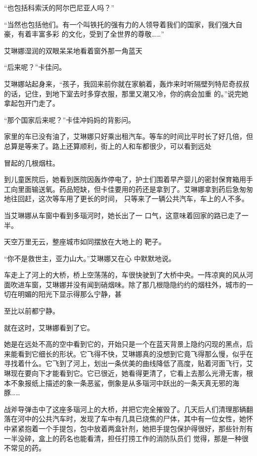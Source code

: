 \documentclass{article}
\begin{document}
“也包括科索沃的阿尔巴尼亚人吗？” 

“当然也包括他们。有一个叫铁托的强有力的人领导着我们的国家，我们强大自豪，有着丰富多彩
的文化，受到了全世界的尊敬……” 

艾琳娜湿润的双眼呆呆地看着窗外那一角蓝天


“后来呢？”卡佳问。 

艾琳娜站起身来，“孩子，我回来前你就在家躺着，轰炸来时听隔壁列特尼奇叔叔的话，记住，到地下室去时多穿衣服，那里又潮又冷，你的病会加重
的。”说完她拿起包开门走了。 

“那个国家后来呢？”卡佳冲妈妈的背影问。

家里的车已没有油了，艾琳娜只好乘出租汽车。等车的时间比平时长了好几倍，但总算是等来了。路上还算顺利，街上的人和车都很少，可以看到远处

\newpage
冒起的几根烟柱。 

到儿童医院后，她看到医院因轰炸停电了，护士们围着早产婴儿的密封保育箱用手工向里面输送氧。药品短缺，但卡佳要用的药还是拿到了。艾琳娜拿到药后急匆匆地往回赶，这次等车用了更长的时间，
只等来了一辆公共汽车，车上的人不多。 

当艾琳娜从车窗中看到多瑙河时，她长出了一
口气，这意味着回家的路已走了一半。 

天空万里无云，整座城市如同摆放在大地上的
靶子。 

“你不是救世主，亚力山大。”艾琳娜又在心
中默默地说。 

车走上了河上的大桥，桥上空荡荡的，车很快驶到了大桥中央。一阵凉爽的风从河面吹进车窗，艾琳娜并没有闻到硝烟味。除了那几根隐隐约约的烟柱外，城市的一切在明媚的阳光下显示得那么宁静，甚

\newpage
至比以前都宁静。 


就在这时，艾琳娜看到了它。 

她是在远处不高的空中看到它的，开始只是一个在蓝天背景上隐约闪现的黑点，后来能看到它细长的形状。它飞得不快，艾琳娜真的没想到它竟飞得那么慢，似乎在寻找着什么。它飞到了河上，划出一条优美的曲线降低了高度，贴着河面飞行，艾琳现在要向下才能看到它。它已很近，她看得更清了，它看上去那么光滑无害，根本不象报纸上描述的象一条恶鲨，倒象是从多瑙河中跃出的一条天真无邪的海豚……

战斧导弹击中了这座多瑙河上的大桥，并把它完全摧毁了。几天后人们清理那辆翻落在河中的公共汽车时，发现了车中有几具已烧焦的尸体，其中有一位女性，她怀中紧紧抱着一个手提包，包中放着两盒针剂，她把手提包保护得很好，那些针剂有一半没碎，盒上的药名也能看清，担任打捞工作的消防队员们
觉得，那是一种很不常见的药。 


\newpage
\end{document}

